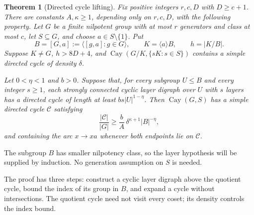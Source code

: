 \documentclass[11pt,a4paper,reqno]{amsart}
\newtheorem{theorem}{Theorem}[section]
\theoremstyle{definition}
\theoremstyle{remark}
\numberwithin{equation}{section}
\DeclareMathOperator{\Cay}{Cay}
\newcommand{\gen}[1]{\langle #1\rangle}
\begin{document}
\begin{theorem}[Directed cycle lifting]\label{thm:directed-lifting}\label{cor:local}
Fix positive integers $r,c,D$ with $D\ge c+1$. There are constants $A,\kappa\ge1$, depending only on $r,c,D$, with the following property. Let $G$ be a finite nilpotent group with at most $r$ generators and class at most $c$, let $S\subseteq G$, and choose $a\in S\setminus\{1\}$. Put
\[
 B=[G,a]:=\gen{[g,a]:g\in G},\qquad K=\gen aB,\qquad h=|K/B|.
\]
Suppose $K\ne G$, $h>8D+4$, and $\Cay(G/K,\{sK:s\in S\})$ contains a simple directed cycle of density $\delta$.

Let $0<\eta<1$ and $b>0$. Suppose that, for every subgroup $U\le B$ and every integer $s\ge1$, each strongly connected cyclic layer digraph over $U$ with $s$ layers has a directed cycle of length at least $bs|U|^{1-\eta}$. Then $\Cay(G,S)$ has a simple directed cycle $\mathcal C$ satisfying
\begin{equation}\label{eq:densityrecurrence}
 \frac{|\mathcal C|}{|G|}\ge\frac bA\,\delta^{\kappa+1}|B|^{-\eta},
\end{equation}
and containing the arc $x\to xa$ whenever both endpoints lie on $\mathcal C$.
\end{theorem}

The subgroup $B$ has smaller nilpotency class, so the layer hypothesis will be supplied by induction. No generation assumption on $S$ is needed.

The proof has three steps: construct a cyclic layer digraph above the quotient cycle, bound the index of its group in $B$, and expand a cycle without intersections. The quotient cycle need not visit every coset; its density controls the index bound.
\end{document}
